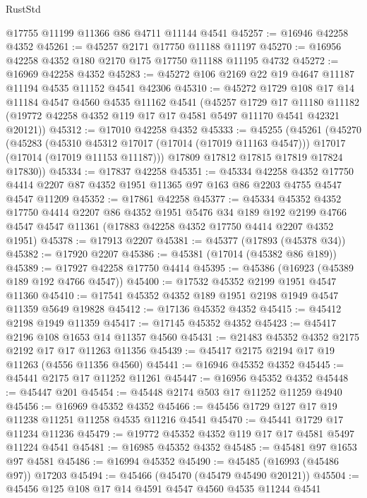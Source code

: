 \begin{lexlean}{RustStd}
\begin{coremodule}
{\begin{coremodule}
{{{{{{{{{{{{{{{{{{{{{{{{{{{{{{{{{{{{{{{{{{{{{{{{{{{{{{{    @17755
    @11199
    @11366
    @86
    @4711
    @11144
    @4541
@45257 := @16946 @42258 @4352
@45261 := @45257 @2171 @17750 @11188 @11197
@45270 := @16956 @42258 @4352 @180 @2170 @175 @17750 @11188 @11195 @4732
@45272 := @16969 @42258 @4352
@45283 := @45272 @106 @2169 @22 @19 @4647 @11187 @11194 @4535 @11152 @4541 @42306
@45310 := @45272
    @1729
    @108
    @17
    @14
    @11184
    @4547
    @4560
    @4535
    @11162
    @4541
    (@45257
      @1729
      @17
      @11180
      @11182
      (@19772 @42258 @4352 @119 @17 @17 @4581 @5497 @11170 @4541 @42321 @20121))
@45312 := @17010 @42258 @4352
@45333 := @45255
    (@45261
      (@45270
        (@45283
          (@45310 @45312 @17017 (@17014 (@17019 @11163 @4547)))
          @17017
          (@17014 (@17019 @11153 @11187)))
        @17809
        @17812
        @17815
        @17819
        @17824
        @17830))
@45334 := @17837 @42258
@45351 := @45334
    @42258
    @4352
    @17750
    @4414
    @2207
    @87
    @4352
    @1951
    @11365
    @97
    @163
    @86
    @2203
    @4755
    @4547
    @4547
    @11209
@45352 := @17861 @42258
@45377 := @45334
    @45352
    @4352
    @17750
    @4414
    @2207
    @86
    @4352
    @1951
    @5476
    @34
    @189
    @192
    @2199
    @4766
    @4547
    @4547
    @11361
    (@17883 @42258 @4352 @17750 @4414 @2207 @4352 @1951)
@45378 := @17913 @2207
@45381 := @45377 (@17893 (@45378 @34))
@45382 := @17920 @2207
@45386 := @45381 (@17014 (@45382 @86 @189))
@45389 := @17927 @42258 @17750 @4414
@45395 := @45386 (@16923 (@45389 @189 @192 @4766 @4547))
@45400 := @17532 @45352 @2199 @1951 @4547 @11360
@45410 := @17541 @45352 @4352 @189 @1951 @2198 @1949 @4547 @11359 @5649 @19828
@45412 := @17136 @45352 @4352
@45415 := @45412 @2198 @1949 @11359
@45417 := @17145 @45352 @4352
@45423 := @45417 @2196 @108 @1653 @14 @11357 @4560
@45431 := @21483 @45352 @4352 @2175 @2192 @17 @17 @11263 @11356
@45439 := @45417 @2175 @2194 @17 @19 @11263 (@4556 @11356 @4560)
@45441 := @16946 @45352 @4352
@45445 := @45441 @2175 @17 @11252 @11261
@45447 := @16956 @45352 @4352
@45448 := @45447 @201
@45454 := @45448 @2174 @503 @17 @11252 @11259 @4940
@45456 := @16969 @45352 @4352
@45466 := @45456 @1729 @127 @17 @19 @11238 @11251 @11258 @4535 @11216 @4541
@45470 := @45441 @1729 @17 @11234 @11236
@45479 := @19772 @45352 @4352 @119 @17 @17 @4581 @5497 @11224 @4541
@45481 := @16985 @45352 @4352
@45485 := @45481 @97 @1653 @97 @4581
@45486 := @16994 @45352
@45490 := @45485 (@16993 (@45486 @97)) @17203
@45494 := @45466 (@45470 (@45479 @45490 @20121))
@45504 := @45456 @125 @108 @17 @14 @4591 @4547 @4560 @4535 @11244 @4541
}}}}}}}}}}}}}}}}}}}}}}}}}}}}}}}}}}}}}}}}}}}}}}}}}}}}}}}
\end{coremodule}}
\end{coremodule}
\end{lexlean}
